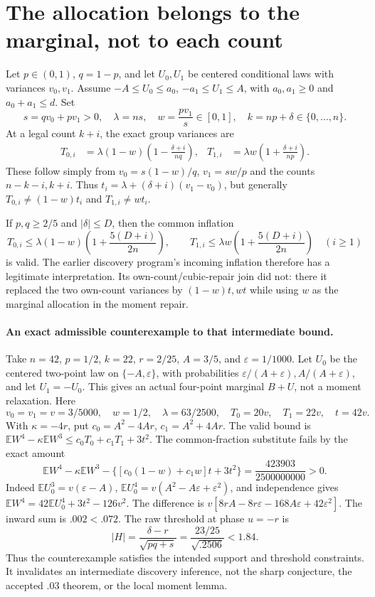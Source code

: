 \documentclass[11pt]{article}
\newcommand{\E}{\mathbb E}
\newcommand{\1}{\mathbf1}
\begin{document}
\section{The allocation belongs to the marginal, not to each count}
Let $p\in(0,1)$, $q=1-p$, and let $U_0,U_1$ be centered conditional
laws with variances $v_0,v_1$. Assume
$-A\le U_0\le a_0$, $-a_1\le U_1\le A$, with
$a_0,a_1\ge0$ and $a_0+a_1\le d$. Set
\[
 s=qv_0+pv_1>0,\quad \lambda=ns,\quad
 w=\frac{pv_1}{s}\in[0,1],\quad k=np+\delta\in\{0,\ldots,n\}.
\]
At a legal count $k+i$, the exact group variances are
\begin{align}\label{eq:transport}
 T_{0,i}&=\lambda(1-w)\left(1-\frac{\delta+i}{nq}\right),&
 T_{1,i}&=\lambda w\left(1+\frac{\delta+i}{np}\right).
\end{align}
These follow simply from $v_0=s(1-w)/q$, $v_1=sw/p$ and the counts
$n-k-i,k+i$. Thus $t_i=\lambda+(\delta+i)(v_1-v_0)$, but generally
$T_{0,i}\ne(1-w)t_i$ and $T_{1,i}\ne wt_i$.

If $p,q\ge2/5$ and $|\delta|\le D$, then the common inflation
\[
 T_{0,i}\le\lambda(1-w)\left(1+\frac{5(D+i)}{2n}\right),\qquad
 T_{1,i}\le\lambda w\left(1+\frac{5(D+i)}{2n}\right)\quad(i\ge1)
\]
is valid. The earlier discovery program's incoming inflation therefore
has a legitimate interpretation. Its own-count/cubic-repair join did not:
there it replaced the two own-count variances by $(1-w)t,wt$ while using
$w$ as the marginal allocation in the moment repair.

\paragraph{An exact admissible counterexample to that intermediate bound.}
Take $n=42$, $p=1/2$, $k=22$, $r=2/25$, $A=3/5$, and
$\varepsilon=1/1000$. Let $U_0$ be the centered two-point law on
$\{-A,\varepsilon\}$, with probabilities
$\varepsilon/(A+\varepsilon),A/(A+\varepsilon)$, and let $U_1=-U_0$.
This gives an actual four-point marginal $B+U$, not a moment relaxation.
Here
\[
 v_0=v_1=v=3/5000,\quad w=1/2,\quad \lambda=63/2500,
 \quad T_0=20v,\quad T_1=22v,\quad t=42v.
\]
With $\kappa=-4r$, put $c_0=A^2-4Ar$, $c_1=A^2+4Ar$.
The valid bound is
$\E W^4-\kappa\E W^3\le c_0T_0+c_1T_1+3t^2$.
The common-fraction substitute fails by the exact amount
\begin{equation}\label{eq:false}
 \E W^4-\kappa\E W^3-
 \{[c_0(1-w)+c_1w]t+3t^2\}
 =\frac{423903}{2500000000}>0.
\end{equation}
Indeed $\E U_0^3=v(\varepsilon-A)$,
$\E U_0^4=v(A^2-A\varepsilon+\varepsilon^2)$, and independence gives
$\E W^4=42\E U_0^4+3t^2-126v^2$.
The difference is
$v[8rA-8r\varepsilon-168A\varepsilon+42\varepsilon^2]$.
The inward sum is $.002<.072$. The raw threshold at phase $u=-r$ is
\[
 |H|=\frac{\delta-r}{\sqrt{pq+s}}
      =\frac{23/25}{\sqrt{.2506}}<1.84.
\]
Thus the counterexample satisfies the intended support and threshold
constraints. It invalidates an intermediate discovery inference, not the
sharp conjecture, the accepted $.03$ theorem, or the local moment lemma.
\end{document}
